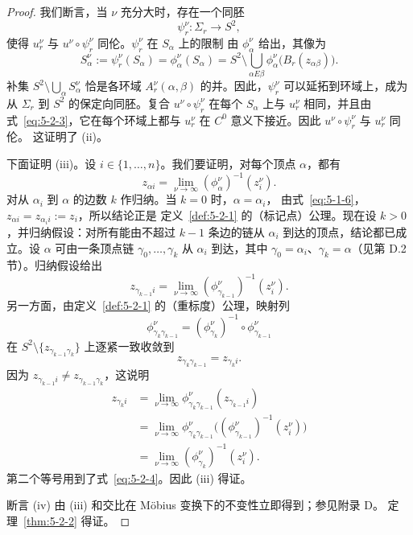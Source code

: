 \begin{proof}
我们断言，当 $\nu$ 充分大时，存在一个同胚
\[
  \psi_r^\nu:\Sigma_r\to S^2,
\]
使得 $u_r^\nu$ 与 $u^\nu\circ\psi_r^\nu$ 同伦。$\psi_r^\nu$ 在 $S_\alpha$ 上的限制
由 $\phi_\alpha^\nu$ 给出，其像为
\[
  S_\alpha^\nu:=\psi_r^\nu(S_\alpha)
  =\phi_\alpha^\nu(S_\alpha)
  =S^2\setminus\bigcup_{\alpha E\beta}
    \phi_\alpha^\nu\bigl(B_r(z_{\alpha\beta})\bigr).
\]
补集 $S^2\setminus\bigcup_\alpha S_\alpha^\nu$ 恰是各环域
$A_r^\nu(\alpha,\beta)$ 的并。因此，$\psi_r^\nu$ 可以延拓到环域上，成为从
$\Sigma_r$ 到 $S^2$ 的保定向同胚。复合 $u^\nu\circ\psi_r^\nu$ 在每个
$S_\alpha$ 上与 $u_r^\nu$ 相同，并且由式~\eqref{eq:5-2-3}，它在每个环域上都与
$u_r^\nu$ 在 $C^0$ 意义下接近。因此 $u^\nu\circ\psi_r^\nu$ 与 $u_r^\nu$ 同伦。
这证明了 (ii)。

下面证明 (iii)。设 $i\in\{1,\ldots,n\}$。我们要证明，对每个顶点 $\alpha$，都有
\[
  z_{\alpha i}=\lim_{\nu\to\infty}(\phi_\alpha^\nu)^{-1}(z_i^\nu).
\]
对从 $\alpha_i$ 到 $\alpha$ 的边数 $k$ 作归纳。当 $k=0$ 时，$\alpha=\alpha_i$，
由式~\eqref{eq:5-1-6}，$z_{\alpha i}=z_{\alpha_i i}:=z_i$，所以结论正是
定义~\ref{def:5-2-1} 的（标记点）公理。现在设 $k>0$，并归纳假设：对所有能由不超过
$k-1$ 条边的链从 $\alpha_i$ 到达的顶点，结论都已成立。设 $\alpha$ 可由一条顶点链
$\gamma_0,\ldots,\gamma_k$ 从 $\alpha_i$ 到达，其中
$\gamma_0=\alpha_i$、$\gamma_k=\alpha$（见第 D.2 节）。归纳假设给出
\begin{equation}\label{eq:5-2-4}
  z_{\gamma_{k-1}i}
  =\lim_{\nu\to\infty}
  (\phi_{\gamma_{k-1}}^\nu)^{-1}(z_i^\nu).
\end{equation}
另一方面，由定义~\ref{def:5-2-1} 的（重标度）公理，映射列
\[
  \phi_{\gamma_k\gamma_{k-1}}^\nu
  =(\phi_{\gamma_k}^\nu)^{-1}\circ\phi_{\gamma_{k-1}}^\nu
\]
在 $S^2\setminus\{z_{\gamma_{k-1}\gamma_k}\}$ 上逐紧一致收敛到
\[
  z_{\gamma_k\gamma_{k-1}}=z_{\gamma_k i}.
\]
因为 $z_{\gamma_{k-1}i}\ne z_{\gamma_{k-1}\gamma_k}$，这说明
\[
  \begin{aligned}
  z_{\gamma_k i}
  &=\lim_{\nu\to\infty}
    \phi_{\gamma_k\gamma_{k-1}}^\nu(z_{\gamma_{k-1}i})\\
  &=\lim_{\nu\to\infty}
    \phi_{\gamma_k\gamma_{k-1}}^\nu
    \bigl((\phi_{\gamma_{k-1}}^\nu)^{-1}(z_i^\nu)\bigr)\\
  &=\lim_{\nu\to\infty}(\phi_{\gamma_k}^\nu)^{-1}(z_i^\nu).
  \end{aligned}
\]
第二个等号用到了式~\eqref{eq:5-2-4}。因此 (iii) 得证。

断言 (iv) 由 (iii) 和交比在 Möbius 变换下的不变性立即得到；参见附录 D。
定理~\ref{thm:5-2-2} 得证。
\end{proof}

